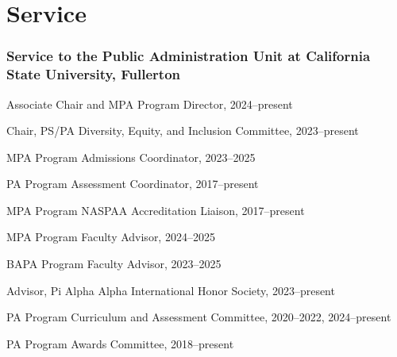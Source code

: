 \documentclass[11pt,letterpaper]{article}
\renewenvironment{itemize}{
  \begin{list}{}{
    \setlength{\leftmargin}{1.5em}
    \setlength{\itemsep}{0.25em}
    \setlength{\parskip}{0pt}
    \setlength{\parsep}{0.25em}
  }
}{
  \end{list}
}
\begin{document}
\section*{Service}

\subsubsection*{Service to the Public Administration Unit at California State University, Fullerton}
\begin{itemize}\leftmargin=2pt\itemindent=-15pt
    \item Associate Chair and MPA Program Director, 2024--present
    \item Chair, PS/PA Diversity, Equity, and Inclusion Committee, 2023--present
    \item MPA Program Admissions Coordinator, 2023--2025
    \item PA Program Assessment Coordinator, 2017--present
    \item MPA Program NASPAA Accreditation Liaison, 2017--present
    \item MPA Program Faculty Advisor, 2024--2025
    \item BAPA Program Faculty Advisor, 2023--2025
    \item Advisor, Pi Alpha Alpha International Honor Society, 2023--present
    \item PA Program Curriculum and Assessment Committee, 2020--2022, 2024--present
    \item PA Program Awards Committee, 2018--present
\end{itemize}
\end{document}
